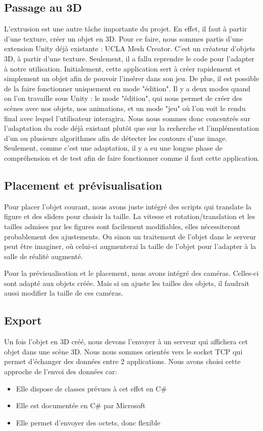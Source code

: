 \documentclass[a4paper,11pt]{article}
\begin{document}
		\hypertarget{ancre}{
		\subsection{Passage au 3D}}
		\label{extrusion}
		L'extrusion est une autre tâche importante du projet. En effet, il faut à partir d'une texture, créer un objet en 3D. Pour ce faire, nous sommes partis d'une extension Unity déjà existante : UCLA Mesh Creator. C'est un créateur d'objets 3D, à partir d'une texture. Seulement, il a fallu reprendre le code pour l'adapter à notre utilisation. Initialement, cette application sert à créer rapidement et simplement un objet afin de pouvoir l'insérer dans son jeu. De plus, il est possible de la faire fonctionner uniquement en mode "édition". Il y a deux modes quand on l'on travaille sous Unity : le mode "édition", qui nous permet de créer des scènes avec nos objets, nos animations, et un mode "jeu" où l'on voit le rendu final avec lequel l'utilisateur interagira. Nous nous sommes donc concentrés sur l'adaptation du code déjà existant plutôt que sur la recherche et l'implémentation d'un ou plusieurs algorithmes afin de détecter les contours d'une image. Seulement, comme c'est une adaptation, il y a eu une longue phase de compréhension et de test afin de faire fonctionner comme il faut cette application. 
		\subsection{Placement et prévisualisation}
		
			Pour placer l'objet courant, nous avons juste intégré des scripts qui translate la figure et des sliders pour choisir la taille. La vitesse et rotation/translation et les tailles admises par les figures sont facilement modifiables, elles nécessiteront probablement des ajustements. Ou sinon un traitement de l'objet dans le serveur peut être imaginer, où celui-ci augmenterai la taille de l'objet pour l'adapter à la salle de réalité augmenté.
			
			Pour la prévisualisation et le placement, nous avons intégré des caméras. Celles-ci sont adapté aux objets créée. Mais si on ajuste les tailles des objets, il faudrait aussi modifier la taille de ces caméras.

		\subsection{Export}
			Un fois l'objet en 3D créé, nous devons l'envoyer à un serveur qui affichera cet objet dans une scène 3D.
			Nous nous sommes orientés vers le socket TCP qui permet d'échanger des données entre 2 applications.
			Nous avons choisi cette approche de l'envoi des données car:
			\begin{itemize}
				\item Elle dispose de classes prévues à cet effet en C\#
				\item Elle est documentée en C\# par Microsoft
				\item Elle permet d'envoyer des octets, donc flexible
			\end{itemize}
						
\end{document}
